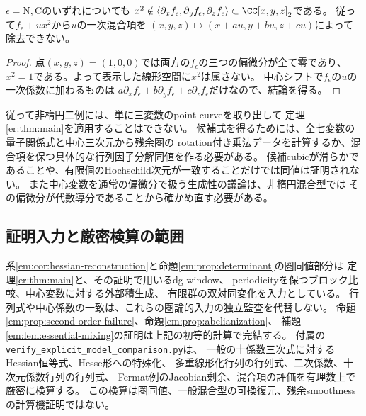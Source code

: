 \begin{lemma}
\label{em:lem:essential-mixing}
$\epsilon=\mathrm N,\mathrm C$のいずれについても
$x^2\notin\langle\partial_xf_\epsilon,\partial_yf_\epsilon,
\partial_zf_\epsilon\rangle\subset\CC[x,y,z]_2$である。
従って$f_\epsilon+ux^2$から$u$の一次混合項を
$(x,y,z)\mapsto(x+a u,y+b u,z+c u)$によって除去できない。
\end{lemma}
\begin{proof}
点$(x,y,z)=(1,0,0)$では両方の$f_\epsilon$の三つの偏微分が全て零であり、
$x^2=1$である。よって表示した線形空間に$x^2$は属さない。
中心シフトで$f_\epsilon$の$u$の一次係数に加わるものは
$a\partial_x f_\epsilon+b\partial_y f_\epsilon+c\partial_z f_\epsilon$だけなので、結論を得る。
\end{proof}

従って非楕円二例には、単に三変数のpoint curveを取り出して
定理\ref{er:thm:main}を適用することはできない。
候補式を得るためには、全七変数の量子関係式と中心三次元から残余圏の
rotation付き乗法データを計算するか、混合項を保つ具体的な行列因子分解同値を作る必要がある。
候補cubicが滑らかであることや、有限個のHochschild次元が一致することだけでは同値は証明されない。
また中心変数を通常の偏微分で扱う生成性の議論は、非楕円混合型では
その偏微分が代数導分であることから確かめ直す必要がある。

\subsection{証明入力と厳密検算の範囲}

系\ref{em:cor:hessian-reconstruction}と命題\ref{em:prop:determinant}の圏同値部分は
定理\ref{er:thm:main}と、その証明で用いるdg window、
periodicityを保つブロック比較、中心変数に対する外部積生成、
有限群の双対同変化\cite[Theorem 4.2, Section 8]{Elagin}を入力としている。
行列式や中心係数の一致は、これらの圏論的入力の独立監査を代替しない。
命題\ref{em:prop:second-order-failure}、命題\ref{em:prop:abelianization}、
補題\ref{em:lem:essential-mixing}の証明は上記の初等的計算で完結する。
付属の\texttt{verify\_explicit\_model\_comparison.py}は、
一般の十係数三次式に対するHessian恒等式、Hesse形への特殊化、
多重線形化行列の行列式、二次係数、十次元係数行列の行列式、
Fermat例のJacobian剰余、混合項の評価を有理数上で厳密に検算する。
この検算は圏同値、一般混合型の可換復元、残余smoothnessの計算機証明ではない。
